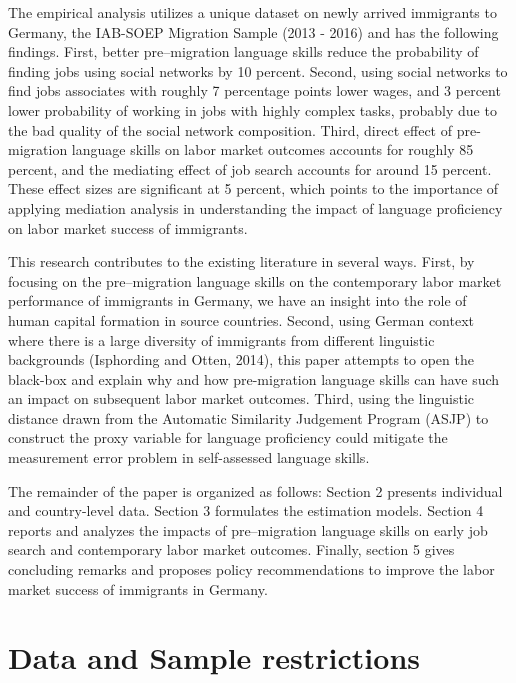 \documentclass[12pt,a4paper]{article}
\begin{document}
The empirical analysis utilizes a unique dataset on newly arrived immigrants to Germany, the IAB-SOEP Migration Sample (2013 - 2016) and has the following findings. First, better pre--migration language skills reduce the probability of finding jobs using social networks by 10 percent. Second, using social networks to find jobs associates with roughly 7 percentage points lower wages, and 3 percent lower probability of working in jobs with highly complex tasks, probably due to the bad quality of the social network composition. Third, direct effect of pre-migration language skills on labor market outcomes accounts for roughly 85 percent, and the mediating effect of job search accounts for around 15 percent. These effect sizes are significant at 5 percent, which points to the importance of applying mediation analysis in understanding the impact of language proficiency on labor market success of immigrants.

This research contributes to the existing literature in several ways. First, by focusing on the pre--migration language skills on the contemporary labor market performance of immigrants in Germany, we have an insight into the role of human capital formation in source countries. Second, using German context where there is a large diversity of immigrants from different linguistic backgrounds (Isphording and Otten, 2014), this paper attempts to open the black-box and explain why and how pre-migration language skills can have such an impact on subsequent labor market outcomes. Third, using the linguistic distance drawn from the Automatic Similarity Judgement Program (ASJP) to construct the proxy variable for language proficiency could mitigate the measurement error problem in self-assessed language skills.

The remainder of the paper is organized as follows: Section 2 presents individual and country-level data. Section 3 formulates the estimation models. Section 4 reports and analyzes the impacts of pre--migration language skills on early job search and contemporary labor market outcomes. Finally, section 5 gives concluding remarks and proposes policy recommendations to improve the labor market success of immigrants in Germany.

\section{Data and Sample restrictions}
\end{document}
